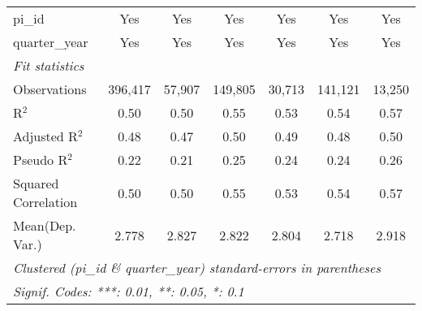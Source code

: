 \begin{tabular}{lcccccc}
   pi\_id                                                     & Yes           & Yes           & Yes           & Yes           & Yes           & Yes\\  
   quarter\_year                                              & Yes           & Yes           & Yes           & Yes           & Yes           & Yes\\  
   \midrule
   \emph{Fit statistics}\\
   Observations                                               & 396,417       & 57,907        & 149,805       & 30,713        & 141,121       & 13,250\\  
   R$^2$                                                      & 0.50          & 0.50          & 0.55          & 0.53          & 0.54          & 0.57\\  
   Adjusted R$^2$                                             & 0.48          & 0.47          & 0.50          & 0.49          & 0.48          & 0.50\\  
   Pseudo R$^2$                                               & 0.22          & 0.21          & 0.25          & 0.24          & 0.24          & 0.26\\  
   Squared Correlation                                        & 0.50          & 0.50          & 0.55          & 0.53          & 0.54          & 0.57\\  
Mean(Dep. Var.) & 2.778 & 2.827 & 2.822 & 2.804 & 2.718 & 2.918 \\
   \midrule \midrule
   \multicolumn{7}{l}{\emph{Clustered (pi\_id \& quarter\_year) standard-errors in parentheses}}\\
   \multicolumn{7}{l}{\emph{Signif. Codes: ***: 0.01, **: 0.05, *: 0.1}}\\
\end{tabular}
\par\endgroup
